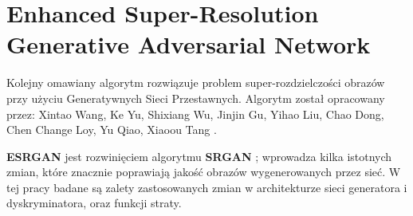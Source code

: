\chapter{Enhanced Super-Resolution Generative Adversarial Network} \label{chap:ESRGAN}

Kolejny omawiany algorytm rozwiązuje problem super-rozdzielczości obrazów przy użyciu Generatywnych Sieci Przestawnych. Algorytm został opracowany przez: Xintao Wang, Ke Yu, Shixiang Wu, Jinjin Gu, Yihao Liu,
Chao Dong, Chen Change Loy, Yu Qiao, Xiaoou Tang \cite{wang2018esrgan}.

\textbf{ESRGAN} jest rozwinięciem algorytmu \textbf{SRGAN} \cite{Ledig_2017_CVPR}; wprowadza kilka istotnych zmian, które znacznie poprawiają jakość obrazów wygenerowanych przez sieć. W tej pracy badane są zalety zastosowanych zmian w architekturze sieci generatora i dyskryminatora, oraz funkcji straty. 


